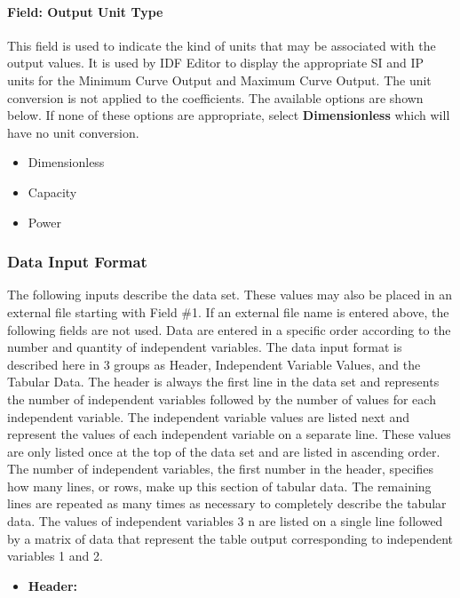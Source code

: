 \paragraph{Field: Output Unit Type}\label{field-output-unit-type-2-000}

This field is used to indicate the kind of units that may be associated with the output values. It is used by IDF Editor to display the appropriate SI and IP units for the Minimum Curve Output and Maximum Curve Output. The unit conversion is not applied to the coefficients. The available options are shown below. If none of these options are appropriate, select \textbf{Dimensionless} which will have no unit conversion.

\begin{itemize}
\item
  Dimensionless
\item
  Capacity
\item
  Power
\end{itemize}

\subsubsection{Data Input Format}\label{data-input-format}

The following inputs describe the data set. These values may also be placed in an external file starting with Field \#1. If an external file name is entered above, the following fields are not used. Data are entered in a specific order according to the number and quantity of independent variables. The data input format is described here in 3 groups as Header, Independent Variable Values, and the Tabular Data. The header is always the first line in the data set and represents the number of independent variables followed by the number of values for each independent variable. The independent variable values are listed next and represent the values of each independent variable on a separate line. These values are only listed once at the top of the data set and are listed in ascending order. The number of independent variables, the first number in the header, specifies how many lines, or rows, make up this section of tabular data. The remaining lines are repeated as many times as necessary to completely describe the tabular data. The values of independent variables 3 n are listed on a single line followed by a matrix of data that represent the table output corresponding to independent variables 1 and 2.

\begin{itemize}
\tightlist
\item
  \textbf{Header:}
\end{itemize}

